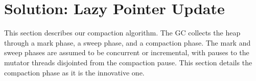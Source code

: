 \documentclass[sigplan,10pt,screen]{acmart}\settopmatter{printfolios=true,printccs=true,printacmref=true}
\begin{document}
%
%


\section{Solution: Lazy Pointer Update}
\label{sec:solution}

This section describes our compaction algorithm. The GC collects the heap through a mark phase, a sweep phase, and a compaction phase. The mark and sweep phases are assumed to be concurrent or incremental, with pauses to the mutator threads disjointed from the compaction pause.
This section details the compaction phase as it is the innovative one.
 
\end{document}

